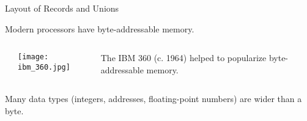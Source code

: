 \documentclass{plt}
\begin{document}
\begin{frame}[fragile]{Layout of Records and Unions}

Modern processors have byte-addressable memory.

\begin{columns}
  \begin{column}{0.1\textwidth}
  \end{column}
  \begin{column}{0.35\textwidth}
    \texttt{[image: ibm\_360.jpg]}
  \end{column}
  \begin{column}{0.4\textwidth}   
    \small The IBM 360 (c. 1964) helped to popularize byte-addressable memory.
  \end{column}
\end{columns}

Many data types (integers, addresses, floating-point numbers) are
wider than a byte.


\end{frame}
\end{document}
